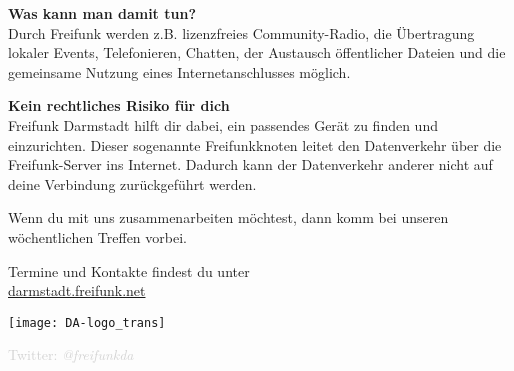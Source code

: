 \documentclass[a4paper]{article}
\begin{document}
\thispagestyle{empty}

\begin{Row}[cellsep=0.75cm]
    \begin{Cell}{4}
    \textbf{Was kann man damit tun?} \\
    Durch Freifunk werden z.B. lizenzfreies Community-Radio, die Übertragung lokaler Events, Telefonieren, Chatten, der Austausch öffentlicher Dateien und die gemeinsame Nutzung eines Internetanschlusses möglich.
    \end{Cell}
\begin{Cell}{5}
    \textbf{Kein rechtliches Risiko für dich} \\
Freifunk Darmstadt hilft dir dabei, ein passendes Gerät zu finden und einzurichten. Dieser sogenannte Freifunkknoten leitet den Datenverkehr über die Freifunk-Server ins Internet. Dadurch kann der Datenverkehr anderer nicht auf deine Verbindung zurückgeführt werden.
\end{Cell}
\end{Row}

\vspace{1.3cm}
\begin{Row}
    \begin{Cell}{1}
	Wenn du mit uns zusammenarbeiten möchtest, dann komm bei unseren wöchentlichen Treffen vorbei.
	\end{Cell}
\end{Row}
\vspace{0.5cm}
\begin{center}
	\large Termine und Kontakte findest du unter \\
	\url{darmstadt.freifunk.net}
\end{center}
\begin{center}
\vspace{-0.5cm}
\hspace*{-0.05 \paperwidth}\texttt{[image: DA-logo\_trans]}

\vspace{-2.7cm}
\large \textcolor{lightgrey}{Twitter: \textit{@freifunkda}}
\end{center}
\end{document}
